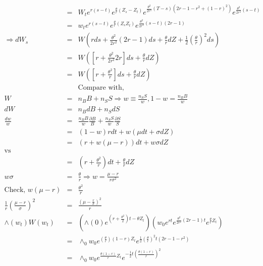 \documentclass[]{article}
\begin{document}
\begin{eqnarray*}
&=& W_t e^{r\left( s-t \right)} e^{\frac{\theta}{r} \left( Z_s - Z_t \right)} e^{\frac{\theta ^2}{2r^2} \left( T-s \right) \left( 2r-1-r^2+\left( 1-r\right)^2\right)} e^{ \frac{\theta ^2}{2r^2} \left( s-t \right)}\\
&=& w_t e^{r\left( s-t\right)} e^{\frac{\theta}{r}\left( Z_s Z_t\right)} e^{\frac{\theta ^2}{2r^2} \left( s-t \right)\left( 2r-1\right)}\\
\Rightarrow dW_s &=& W\left( rds + \frac{\theta ^2}{2r^2} \left( 2r-1 \right)ds + \frac{\theta}{r}dZ + \frac{1}{2} \left( \frac{\theta}{r}\right)^2 ds\right)\\
&=& W\left( \left[ r+\frac{\theta ^2}{2r^2} 2r\right]ds + \frac{\theta}{r}dZ \right)\\
&=& W \left( \left[ r+ \frac{\theta ^2}{r} \right] ds + \frac{\theta}{r} dZ\right)\\
&& \mbox{Compare with, }\\
W &=& n_B B + n_S S \Rightarrow w \equiv \frac{n_S S}{w}, 1-w = \frac{n_B B}{w}\\
dW &=& n_B dB + n_S dS\\
\frac{dw}{w} &=& \frac{n_B B}{w} \frac{\partial B}{B} + \frac{n_S S}{w} \frac{\partial S}{S}\\
&=& \left( 1-w \right) r dt + w \left( \mu dt + \sigma dZ\right)\\
&=& \left( r + w\left( \mu -r\right)\right)dt + w \sigma dZ\\
\mbox{vs} && \\
&=& \left( r+\frac{\theta ^2}{r} \right)dt + \frac{\theta}{r}dZ\\
w \sigma &=& \frac{\theta}{r} \Rightarrow w = \frac{\mu -r}{r\sigma ^2}\\
\mbox{Check, } w \left( \mu -r \right) &=& \frac{\theta ^2}{r}\\
\frac{1}{r} \left( \frac{\mu -r}{\sigma} \right)^2 &=& \frac{\left( \mu - \frac{r}{\sigma}\right)^2}{r}\\
\wedge (w_t) W(w_t) &=& \left( \wedge (0) e^{\left(r+\frac{\theta ^2}{2}\right) t-\theta Z_t} \right)\left( w_0 e^{rt} e^{\frac{\theta ^2}{2r^2} \left( 2r-1\right) t} e^{\frac{\theta}{r} Z_t}\right)\\
&=& \wedge _0 w_0 e^{\left( \frac{\theta}{r}\right) \left( 1-r \right)Z_t} e^{\frac{1}{2} \left( \frac{\theta}{r}\right)^2 t \left( 2r-1-r^2 \right)}\\
&=& \wedge _0 w_0 e^{\frac{\theta \left( 1-r \right)}{r} Z_t} e^{-\frac{1}{2} t \left( \frac{\theta \left( 1-r\right)}{r} \right)^2}\\

\end{eqnarray*}
\end{document}
